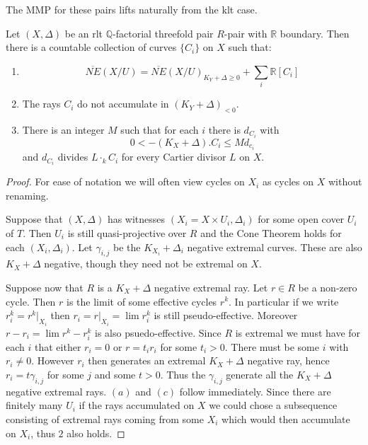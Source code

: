 	The MMP for these pairs lifts naturally from the klt case.
	
	
	\begin{theorem}
		Let $(X,\Delta)$ be an rlt $\mathbb{Q}$-factorial threefold pair $R$-pair with $\mathbb{R}$ boundary. Then there is a countable collection of curves $\{C_{i}\}$ on $X$ such that:
		\begin{enumerate}
			\item $$\overline{NE}(X/U)=\overline{NE}(X/U)_{K_{Y}+\Delta \geq 0} + \sum_{i} \mathbb{R}[C_{i}]$$
			\item The rays $C_{i}$ do not accumulate in $(K_{Y}+\Delta)_{<0}$.
			\item There is an integer $M$ such that for each $i$ there is $d_{C_{i}}$ with 
			\[0 < -(K_{X}+\Delta).C_{i} \leq Md_{c_{i}}\]
			and $d_{C_{i}}$ divides $L\cdot_{k}C_{i}$ for every Cartier divisor $L$ on $X$.
		\end{enumerate}
	\end{theorem}
	
	
	\begin{proof}
		
		For ease of notation we will often view cycles on $X_{i}$ as cycles on $X$ without renaming.
		
		Suppose that $(X,\Delta)$ has witnesses $(X_{i}=X \times U_{i}, \Delta_{i})$ for some open cover $U_{i}$ of $T$. Then $U_{i}$ is still quasi-projective over $R$ and the Cone Theorem holds for each $(X_{i},\Delta_{i})$. Let $\gamma_{i,j}$ be the $K_{X_{i}}+\Delta_{i}$ negative extremal curves. These are also $K_{X}+\Delta$ negative, though they need not be extremal on $X$.
		
		Suppose now that $R$ is a $K_{X}+\Delta$ negative extremal ray. Let $r\in R$ be a non-zero cycle. Then $r$ is the limit of some effective cycles $r^{k}$. In particular if we write $r^{k}_{i}=r^{k}|_{X_{i}}$ then $r_{i}=r|_{X_{i}}=\lim r^{k}_{i}$ is still pseudo-effective. Moreover $r-r_{i}=\lim r^{k}-r^{k}_{i}$ is also psuedo-effective. Since $R$ is extremal we must have for each $i$ that either $r_{i}=0$ or $r=t_{i}r_{i}$ for some $t_{i} > 0$. There must be some $i$ with $r_{i} \neq 0$. However $r_{i}$ then generates an extremal $K_{X}+\Delta$ negative ray, hence $r_{i}=t\gamma_{i,j}$ for some $j$ and some $t>0$. Thus the $\gamma_{i,j}$ generate all the $K_{X}+\Delta$ negative extremal rays. $(a)$ and $(c)$ follow immediately. Since there are finitely many $U_{i}$ if the rays accumulated on $X$ we could chose a subsequence consisting of extremal rays coming from some $X_{i}$ which would then accumulate on $X_{i}$, thus $2$ also holds.
	\end{proof}


